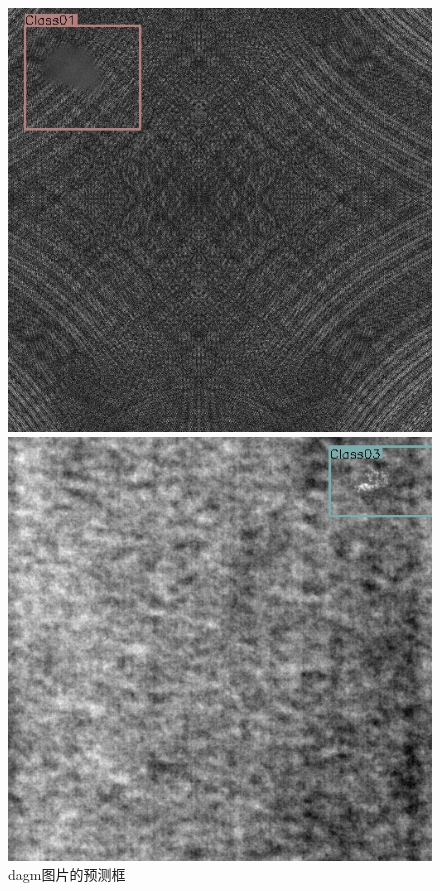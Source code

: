 \begin{figure}[!tbp]
    \centering
    \begin{minipage}[b]{0.4\textwidth}
      \includegraphics[width=\textwidth]{figures/33.jpg}
    \end{minipage}
    \hfill
    \begin{minipage}[b]{0.4\textwidth}
      \includegraphics[width=\textwidth]{figures/167.jpg}
    \end{minipage}
    \caption{dagm图片的预测框}
    \label{fig:dagm-after}
    \vspace{-1em}
\end{figure}

